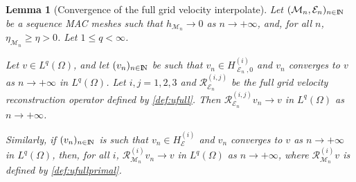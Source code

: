 \documentclass{amsart}
\newtheorem{lm}{Lemma}
\numberwithin{equation}{section}
\begin{document}
\begin{lm}[Convergence of the full grid velocity interpolate]\label{lem:conv-uchapeau}
  Let $({{\mathcal M}}_n, {{\mathcal E}}_n)_{{n \in {\ifmmode{\rm	I\mkern-3.1mu
N\mkern0.5mu}\else{\rm I\kern-.16em
N\hskip0.5pt\ }\fi\relax}}}$ be a sequence MAC meshes such that $h_{{{\mathcal M}}_n} \to 0$ as ${{n {\rightarrow} + \infty}}$, and, for all $n$, $\eta_{{{\mathcal M}}_n} \ge \eta >0$.  Let $1 \le q < \infty$.
  
  Let $ v \in L^q(\Omega)$, and let $(v_n)_{{n \in {\ifmmode{\rm	I\mkern-3.1mu
N\mkern0.5mu}\else{\rm I\kern-.16em
N\hskip0.5pt\ }\fi\relax}}}$ be such that $v_n \in H_{\operatorname{{\mathcal{E}}}_n,0}^{(i)}$  and $v_n$ converges to $ v$ as ${{n {\rightarrow} + \infty}}$  in $L^q(\Omega)$. 
  Let $i,j = 1,2,3$ and $\mathcal R_{{{\mathcal E}}_n}^{(i,j)}$ be the full grid velocity reconstruction operator defined by \eqref{def:ufull}. 
  Then $\mathcal  R_{{{\mathcal E}}_n}^{(i,j)} v_n \to  v $ in $L^q(\Omega)$ as ${{n {\rightarrow} + \infty}}$.
  
  Similarly, if $(v_n)_{{n \in {\ifmmode{\rm	I\mkern-3.1mu
N\mkern0.5mu}\else{\rm I\kern-.16em
N\hskip0.5pt\ }\fi\relax}}}$ is such that $v_n \in {H_{{\mathcal E}}^{(i)}}$  and $v_n$ converges to $ v$ as ${{n {\rightarrow} + \infty}}$  in $L^q(\Omega)$, then, for all $i$,
  $\mathcal R_{{{\mathcal M}}_n}^{(i)}  v_n \to  v $ in $L^q(\Omega)$ as ${{n {\rightarrow} + \infty}}$, where $\mathcal R_{{{\mathcal M}}_n}^{(i)}  v$ is defined by \eqref{def:ufullprimal}.
\end{lm}
\end{document}
